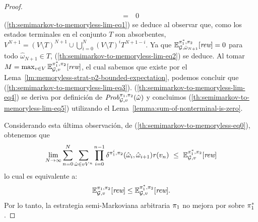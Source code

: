 \begin{proof}
\begin{align}
    = \ & 0  \label{th:semimarkov-to-memoryless-lim-eq5}
  \end{align}
  (\ref{th:semimarkov-to-memoryless-lim-eq1}) se deduce al observar que,
  como los estados terminales en el conjunto $T$ son absorbentes,
  $V^{N+1}=(V\setminus T)^{N+1}\cup\bigcup_{i=0}^N(V\setminus T)^iT^{N+1-i}$.
  Ya que
  $\mathbb{E}^{\pi^*_{1}, \pi_{2}}_{\mathcal{G}, \hat{\omega}_{N+1}}[\textit{rew}]=0$
  para todo $\hat{\omega}_{N+1}\in T$, (\ref{th:semimarkov-to-memoryless-lim-eq2})
  se deduce.
  Al tomar
  $M = \max_{v\in V} \mathbb{E}^{\pi^*_{1}, \pi_{2}}_{\mathcal{G}, v}[\textit{rew}]$,
  el cual sabemos que existe por el Lema~\ref{lm:memoryless-strat-p2-bounded-expectation}, podemos concluir que
  (\ref{th:semimarkov-to-memoryless-lim-eq3}).
  (\ref{th:semimarkov-to-memoryless-lim-eq4}) se deriva por definición de
  $\mathit{Prob}^{\pi_{1}, \pi_{2}}_{\mathcal{G},v}(\hat{\omega})$ y concluimos
  (\ref{th:semimarkov-to-memoryless-lim-eq5}) utilizando
  el Lema~\ref{lemma:sum-of-nonterminal-is-zero}.
  

  Considerando esta última observación, de
  (\ref{th:semimarkov-to-memoryless-eq0}), obtenemos que
  \[
  \lim_{N \rightarrow \infty}	\sum^{N}_{n=0}\sum_{\hat{\omega} \in vV^{n}} \prod^{n-1}_{i=0}\delta^{\strat{1}^i,\strat{2}}(\hat{\omega}_i, \hat{\omega}_{i+1}) \reward(v_n) \ \leq \ \Expect{\starredstrat{1}}{\strat{2}}_{\StochG,v}[\Rewards]
  \]
  lo cual es equivalente a:
  \[
  \mathbb{E}^{\pi_{1}, \pi_{2}}_{\mathcal{G},v}[\textit{rew}] \leq \mathbb{E}^{\pi^*_{1}, \pi_{2}}_{\mathcal{G},v}[\textit{rew}].
  \]
  Por lo tanto, la estrategia semi-Markoviana arbitraria $\pi_{1}$ no mejora por sobre $\pi^*_{1}$.
  \qedhere
\end{proof}

